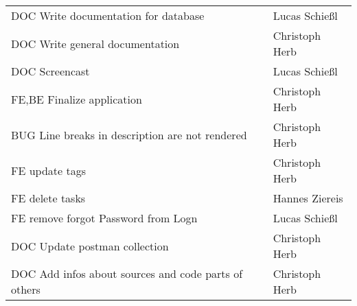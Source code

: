 \begin{longtable}{ll}
DOC Write documentation for database & Lucas Schießl \\
DOC Write general documentation & Christoph Herb \\
DOC Screencast & Lucas Schießl \\
FE,BE Finalize application & Christoph Herb \\
BUG Line breaks in description are not rendered & Christoph Herb \\
FE  update tags & Christoph Herb \\
FE delete tasks & Hannes Ziereis \\
FE remove forgot Password from Logn & Lucas Schießl \\
DOC Update postman collection & Christoph Herb \\
DOC Add infos about sources and code parts of others & Christoph Herb \\
\end{longtable}
